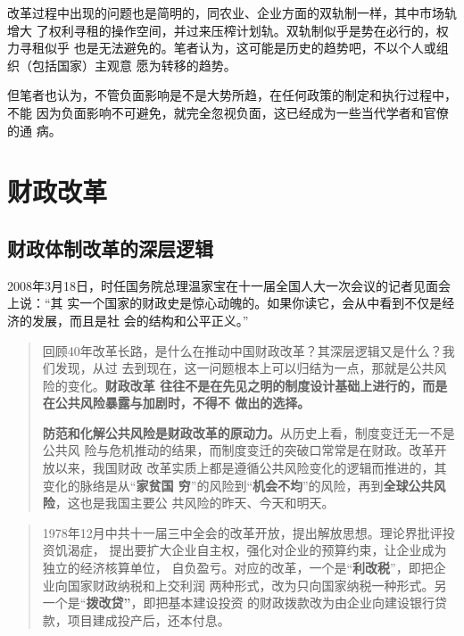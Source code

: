 改革过程中出现的问题也是简明的，同农业、企业方面的双轨制一样，其中市场轨增大
了权利寻租的操作空间，并过来压榨计划轨。双轨制似乎是势在必行的，权力寻租似乎
也是无法避免的。笔者认为，这可能是历史的趋势吧，不以个人或组织（包括国家）主观意
愿为转移的趋势。

但笔者也认为，不管负面影响是不是大势所趋，在任何政策的制定和执行过程中，不能
因为负面影响不可避免，就完全忽视负面，这已经成为一些当代学者和官僚的通
病。

\section{财政改革}

\subsection{财政体制改革的深层逻辑}

2008年3月18日，时任国务院总理温家宝在十一届全国人大一次会议的记者见面会上说：“其
实一个国家的财政史是惊心动魄的。如果你读它，会从中看到不仅是经济的发展，而且是社
会的结构和公平正义。”

\begin{quotation}
  回顾40年改革长路，是什么在推动中国财政改革？其深层逻辑又是什么？我们发现，从过
  去到现在，这一问题根本上可以归结为一点，那就是公共风险的变化。\textbf{财政改革
    往往不是在先见之明的制度设计基础上进行的，而是在公共风险暴露与加剧时，不得不
    做出的选择。}

  \textbf{防范和化解公共风险是财政改革的原动力。}从历史上看，制度变迁无一不是公共风
  险与危机推动的结果，而制度变迁的突破口常常是在财政。改革开放以来，我国财政
  改革实质上都是遵循公共风险变化的逻辑而推进的，其变化的脉络是从“\textbf{家贫国
    穷}”的风险到“\textbf{机会不均}”的风险，再到\textbf{全球公共风险}，这也是我国主要公
  共风险的昨天、今天和明天。\cite{cai40}
\end{quotation}

\begin{quotation}
  1978年12月中共十一届三中全会的改革开放，提出解放思想。理论界批评投资饥渴症，
  提出要扩大企业自主权，强化对企业的预算约束，让企业成为独立的经济核算单位，
  自负盈亏。对应的改革，一个是“\textbf{利改税}”，即把企业向国家财政纳税和上交利润
  两种形式，改为只向国家纳税一种形式。另一个是“\textbf{拨改贷”}，即把基本建设投资
  的财政拨款改为由企业向建设银行贷款，项目建成投产后，还本付息。\cite{bogaidai30}
\end{quotation}

